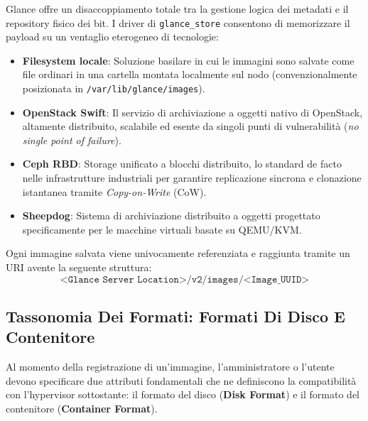 \documentclass[11pt, a4paper]{article}
\begin{document}
Glance offre un disaccoppiamento totale tra la gestione logica dei metadati e il repository fisico dei bit. I driver di \texttt{glance\_store} consentono di memorizzare il payload su un ventaglio eterogeneo di tecnologie:
\begin{itemize}[noitemsep]
    \item \textbf{Filesystem locale}: Soluzione basilare in cui le immagini sono salvate come file ordinari in una cartella montata localmente sul nodo (convenzionalmente posizionata in \texttt{/var/lib/glance/images}).
    \item \textbf{OpenStack Swift}: Il servizio di archiviazione a oggetti nativo di OpenStack, altamente distribuito, scalabile ed esente da singoli punti di vulnerabilità (\emph{no single point of failure}).
    \item \textbf{Ceph RBD}: Storage unificato a blocchi distribuito, lo standard de facto nelle infrastrutture industriali per garantire replicazione sincrona e clonazione istantanea tramite \emph{Copy-on-Write} (CoW).
    \item \textbf{Sheepdog}: Sistema di archiviazione distribuito a oggetti progettato specificamente per le macchine virtuali basate su QEMU/KVM.
\end{itemize}

Ogni immagine salvata viene univocamente referenziata e raggiunta tramite un URI avente la seguente struttura:
\[
\texttt{<Glance Server Location>/v2/images/<Image\_UUID>}
\]

\subsection{Tassonomia Dei Formati: Formati Di Disco E Contenitore}

Al momento della registrazione di un'immagine, l'amministratore o l'utente devono specificare due attributi fondamentali che ne definiscono la compatibilità con l'hypervisor sottostante: il formato del disco (\textbf{Disk Format}) e il formato del contenitore (\textbf{Container Format}).
\end{document}
